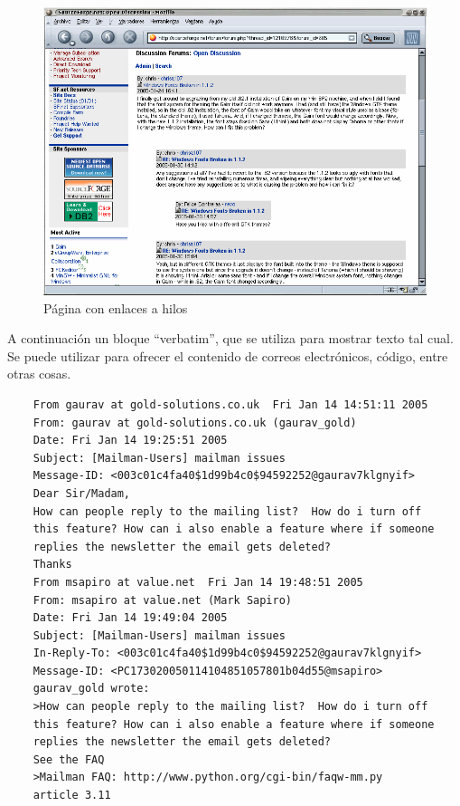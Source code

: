 \documentclass[a4paper, 12pt]{book}
\begin{document}
 \begin{figure}
    \centering
    \includegraphics[bb=0 0 800 600, width=12cm, keepaspectratio]{img/foro1}
    \caption{Página con enlaces a hilos}
    \label{figura:foro_hilos}
 \end{figure}

A continuación un bloque ``verbatim'', que se utiliza para mostrar texto tal cual.
Se puede utilizar para ofrecer el contenido de correos electrónicos, código, entre otras cosas.

{\footnotesize
\begin{verbatim}
    From gaurav at gold-solutions.co.uk  Fri Jan 14 14:51:11 2005
    From: gaurav at gold-solutions.co.uk (gaurav_gold)
    Date: Fri Jan 14 19:25:51 2005
    Subject: [Mailman-Users] mailman issues
    Message-ID: <003c01c4fa40$1d99b4c0$94592252@gaurav7klgnyif>
    Dear Sir/Madam,
    How can people reply to the mailing list?  How do i turn off
    this feature? How can i also enable a feature where if someone
    replies the newsletter the email gets deleted?
    Thanks
    From msapiro at value.net  Fri Jan 14 19:48:51 2005
    From: msapiro at value.net (Mark Sapiro)
    Date: Fri Jan 14 19:49:04 2005
    Subject: [Mailman-Users] mailman issues
    In-Reply-To: <003c01c4fa40$1d99b4c0$94592252@gaurav7klgnyif>
    Message-ID: <PC173020050114104851057801b04d55@msapiro>
    gaurav_gold wrote:
    >How can people reply to the mailing list?  How do i turn off
    this feature? How can i also enable a feature where if someone
    replies the newsletter the email gets deleted?
    See the FAQ
    >Mailman FAQ: http://www.python.org/cgi-bin/faqw-mm.py
    article 3.11
\end{verbatim}
}
\end{document}
